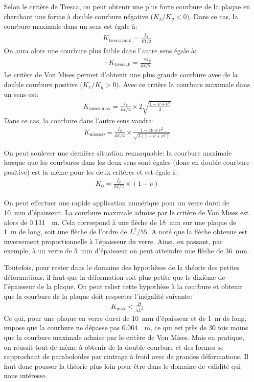 \documentclass[11pt,titlepage]{article}
\begin{document}
Selon le critère de Tresca, on peut obtenir une plus forte courbure de la plaque en cherchant une forme à double courbure négative ($K_x/K_y < 0$). Dans ce cas, la courbure maximale dans un sens est égale à:
\begin{align}
K_{\text{tresca,max}} = \frac{f_y}{Et/2}
\end{align}
On aura alors une courbure plus faible dans l'autre sens égale à:
\begin{align}
    -K_{\text{tresca,0}} = \frac{-\nu f_y}{Et/2}
\end{align}
Le critère de Von Mises permet d'obtenir une plus grande courbure avec de la double courbure positive ($K_x/K_y > 0$). Avec ce critère la courbure maximale dans un sens est:
\begin{align}
K_{\text{mises,max}} = \frac{f_y}{Et/2}\times 2\sqrt{\frac{1-\nu+\nu^2}{3}}
\end{align}
Dans ce cas, la courbure dans l'autre sens vaudra:
\begin{align}
    K_{\text{mises,0}} = \frac{f_y}{Et/2}\times \frac{1-4\nu+\nu^2}{\sqrt{3(1-\nu+\nu^2)}}
\end{align}

On peut soulever une dernière situation remarquable: la courbure maximale lorsque que les courbures dans les deux sens sont égales (donc en double courbure positive) est la même pour les deux critères et est égale à:
\begin{align}
    K_0 = \frac{f_y}{Et/2}\times (1-\nu)
\end{align}

On peut effectuer une rapide application numérique pour un verre durci de \qty{10}{\milli\metre} d'épaisseur. La courbure maximale admise par le critère de Von Mises est alors de \qty{0.131}{\per\metre}. Cela correspond à une flèche de \qty{18}{\milli\metre} sur une plaque de \qty{1}{\metre} de long, soit une flèche de l'ordre de $L^2/55$. A noté que la flèche obtenue est inversement proportionnelle à l'épaisseur du verre. Ainsi, en passant, par exemple, à un verre de \qty{5}{\milli\metre} d'épaisseur on peut atteindre une flèche de \qty{36}{\milli\metre}.

Toutefois, pour rester dans le domaine des hypothèses de la théorie des petites déformations, il faut que la déformation soit plus petite que le dixième de l'épaisseur de la plaque. On peut relier cette hypothèse à la courbure et obtenir que la courbure de la plaque doit respecter l'inégalité suivante:
\begin{align}
K_{\text{max}} < \frac{2t}{5L^2}
\end{align}
Ce qui, pour une plaque en verre durci de \qty{10}{\milli\metre} d'épaisseur et de \qty{1}{\metre} de long, impose que la courbure ne dépasse pas \qty{0.004}{\per\metre}, ce qui est près de 30 fois moins que la courbure maximale admise par le critère de Von Mises. Mais en pratique, on réussit tout de même à obtenir de la double courbure et des formes se rapprochant de paraboloïdes par cintrage à froid avec de grandes déformations. Il faut donc pousser la théorie plus loin pour être dans le domaine de validité qui nous intéresse.
\end{document}
